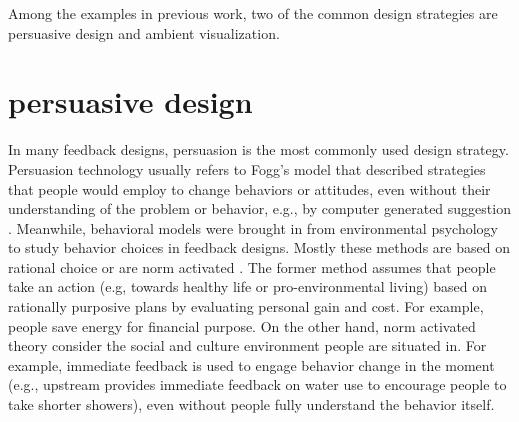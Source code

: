 \documentclass[12pt,oneside]{book}
\begin{document}
Among the examples in previous work, two of the common design strategies are persuasive design and ambient visualization.

\section{persuasive design}
\label{relatedWork:persuasive design}
In many feedback designs, persuasion is the most commonly used design strategy.  Persuasion technology usually refers to Fogg's model \cite{fogg_behavior_2009} that described strategies that people would employ to change behaviors or attitudes, even without their understanding of the problem or behavior, e.g., by computer generated suggestion \cite{andrew_toward_2007}.  Meanwhile, behavioral models were brought in from environmental psychology to study behavior choices in feedback designs.  Mostly these methods are based on rational choice or are norm activated \cite{abrahamse_review_2005, froehlich_design_2010, strengers_designing_2011,he_one_2010}. The former method assumes that people take an action (e.g, towards healthy life or pro-environmental living) based on rationally purposive plans by evaluating personal gain and cost. For example, people save energy for financial purpose. On the other hand, norm activated theory consider the social and culture environment people are situated in.  For example, immediate feedback is used to engage behavior change in the moment (e.g., upstream \cite{kuznetsov_upstream:_2010} provides immediate feedback on water use to encourage people to take shorter showers), even without people fully understand the behavior itself. 
\end{document}
